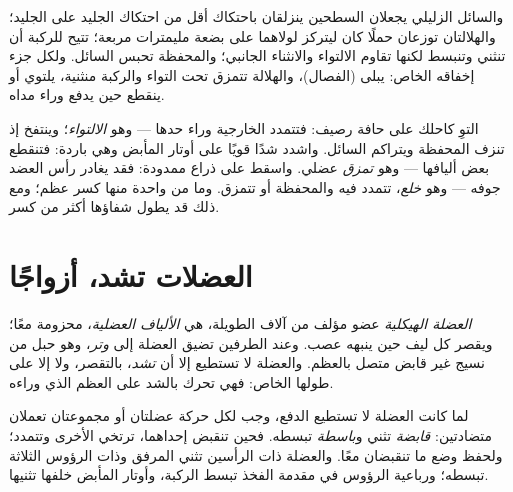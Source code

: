 \begin{proposition}\label{prop:g10:muscles-and-joints:parts}
 والسائل الزليلي يجعلان السطحين ينزلقان باحتكاك أقل من احتكاك
الجليد على الجليد؛ والهلالتان توزعان حملًا كان ليتركز لولاهما على بضعة
مليمترات مربعة؛  تتيح للركبة أن تنثني وتنبسط لكنها تقاوم
الالتواء والانثناء الجانبي؛ والمحفظة تحبس السائل. ولكل جزء إخفاقه
الخاص:  يبلى (الفصال)، والهلالة تتمزق تحت التواء والركبة
منثنية،  يلتوي أو ينقطع حين يدفع  وراء مداه.
\end{proposition}
\admitted

\begin{example}\label{ex:g10:muscles-and-joints:injuries}
التوِ كاحلك على حافة رصيف: فتتمدد  الخارجية وراء حدها --- وهو
\emph{الالتواء}؛ وينتفخ  إذ تنزف المحفظة ويتراكم السائل. واشدد
شدًا قويًا على أوتار المأبض وهي باردة: فتنقطع بعض أليافها --- وهو
\emph{تمزق} عضلي. واسقط على ذراع ممدودة: فقد يغادر رأس العضد جوفه ---
وهو \emph{خلع}، تتمدد فيه  والمحفظة أو تتمزق. وما من واحدة
منها كسر عظم؛ ومع ذلك قد يطول شفاؤها أكثر من كسر.
\end{example}

\section{العضلات تشد، أزواجًا}

\begin{definition}\label{def:g10:muscles-and-joints:muscle}
\emph{العضلة الهيكلية} عضو مؤلف من آلاف 
الطويلة، هي \emph{الألياف العضلية}، محزومة معًا؛ ويقصر كل ليف حين
ينبهه عصب. وعند الطرفين تضيق العضلة إلى \emph{وتر}، وهو
حبل من نسيج غير قابض متصل بالعظم. والعضلة لا تستطيع إلا أن
\emph{تشد}، بالتقصر، ولا إلا على طولها الخاص: فهي تحرك  بالشد
على العظم الذي وراءه.
\end{definition}

\begin{proposition}\label{prop:g10:muscles-and-joints:antagonists}
لما كانت العضلة لا تستطيع الدفع، وجب لكل حركة  عضلتان أو
مجموعتان تعملان متضادتين: \emph{قابضة} تثني  و\emph{باسطة}
تبسطه. فحين تنقبض إحداهما، ترتخي الأخرى وتتمدد؛ ولحفظ وضع ما تنقبضان
معًا. والعضلة ذات الرأسين تثني المرفق وذات الرؤوس الثلاثة تبسطه؛
ورباعية الرؤوس في مقدمة الفخذ تبسط الركبة، وأوتار المأبض خلفها تثنيها.
\end{proposition}
\admitted

